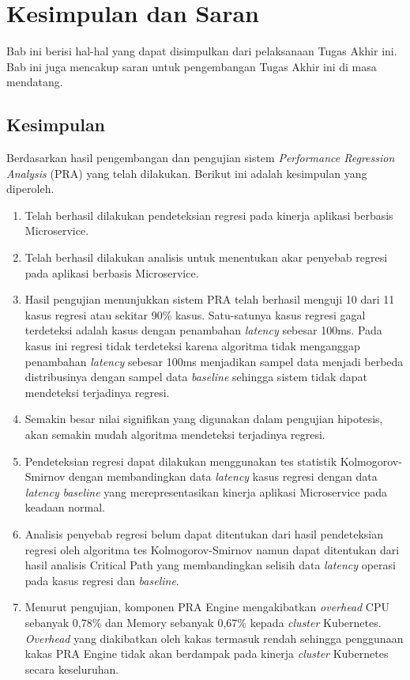 \chapter{Kesimpulan dan Saran}
Bab ini berisi hal-hal yang dapat disimpulkan dari pelaksanaan Tugas Akhir ini. Bab ini juga mencakup saran untuk pengembangan Tugas Akhir ini di masa mendatang.

\section{Kesimpulan}
Berdasarkan hasil pengembangan dan pengujian sistem \textit{Performance Regression Analysis} (PRA) yang telah dilakukan. Berikut ini adalah kesimpulan yang diperoleh.
\begin{enumerate}
	\item Telah berhasil dilakukan pendeteksian regresi pada kinerja aplikasi berbasis Microservice.
	\item Telah berhasil dilakukan analisis untuk menentukan akar penyebab regresi pada aplikasi berbasis Microservice.
	\item Hasil pengujian menunjukkan sistem PRA telah berhasil menguji 10 dari 11 kasus regresi atau sekitar 90\% kasus. Satu-satunya kasus regresi gagal terdeteksi adalah kasus dengan penambahan \textit{latency} sebesar 100ms. Pada kasus ini regresi tidak terdeteksi karena algoritma tidak menganggap penambahan \textit{latency} sebesar 100ms menjadikan sampel data menjadi berbeda distribusinya dengan sampel data \textit{baseline} sehingga sistem tidak dapat mendeteksi terjadinya regresi.
	\item Semakin besar nilai signifikan yang digunakan dalam pengujian hipotesis, akan semakin mudah algoritma mendeteksi terjadinya regresi. 
	\item Pendeteksian regresi dapat dilakukan menggunakan tes statistik Kolmogorov-Smirnov dengan membandingkan data \textit{latency} kasus regresi dengan data \textit{latency} \textit{baseline} yang merepresentasikan kinerja aplikasi Microservice pada keadaan normal.
	\item Analisis penyebab regresi belum dapat ditentukan dari hasil pendeteksian regresi oleh algoritma tes Kolmogorov-Smirnov namun dapat ditentukan dari hasil analisis Critical Path yang membandingkan selisih data \textit{latency} operasi pada kasus regresi dan \textit{baseline}.
	\item Menurut pengujian, komponen PRA Engine mengakibatkan \textit{overhead} CPU sebanyak 0,78\% dan Memory sebanyak 0,67\% kepada \textit{cluster} Kubernetes. \textit{Overhead} yang diakibatkan oleh kakas termasuk rendah sehingga penggunaan kakas PRA Engine tidak akan berdampak pada kinerja \textit{cluster} Kubernetes secara keseluruhan.
\end{enumerate}

